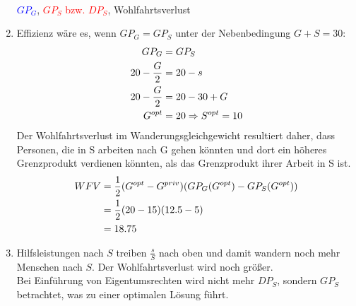 \documentclass{article}
\begin{document}
\begin{enumerate}[label=(\alph*)]
\begin{center}
 \\
			\textcolor{blue}{$GP_G$}, \textcolor{red}{$GP_S$ bzw. $DP_S$}, \textcolor{green!80!black}{Wohlfahrtsverlust}
		\end{center}
		\item Effizienz wäre es, wenn $GP_G=GP_S$ unter der Nebenbedingung $G+S=30$:
		\begin{align}
			GP_G &= GP_S \notag \\
			20-\frac{G}{2} &= 20-s \notag \\
			20-\frac{G}{2} &= 20-30+G \notag \\
			G^{opt} &= 20 \Rightarrow S^{opt} = 10 \notag
		\end{align}
		Der Wohlfahrtsverlust im Wanderungsgleichgewicht resultiert daher, dass Personen, die in S arbeiten nach G gehen könnten und dort ein höheres Grenzprodukt verdienen könnten, als das Grenzprodukt ihrer Arbeit in S ist.
		\begin{align}
			WFV &= \frac{1}{2}(G^{opt} - G^{priv})(GP_G(G^{opt}) - GP_S(G^{opt})) \notag \\
			&= \frac{1}{2}(20-15)(12.5-5) \notag \\
			&= 18.75 \notag
		\end{align}
		\item Hilfsleistungen nach $S$ treiben $\frac{s}{S}$ nach oben und damit wandern noch mehr Menschen nach $S$. Der Wohlfahrtsverlust wird noch größer. \\
		Bei Einführung von Eigentumsrechten wird nicht mehr $DP_S$, sondern $GP_S$ betrachtet, was zu einer optimalen Lösung führt.
	\end{enumerate}
\end{document}
